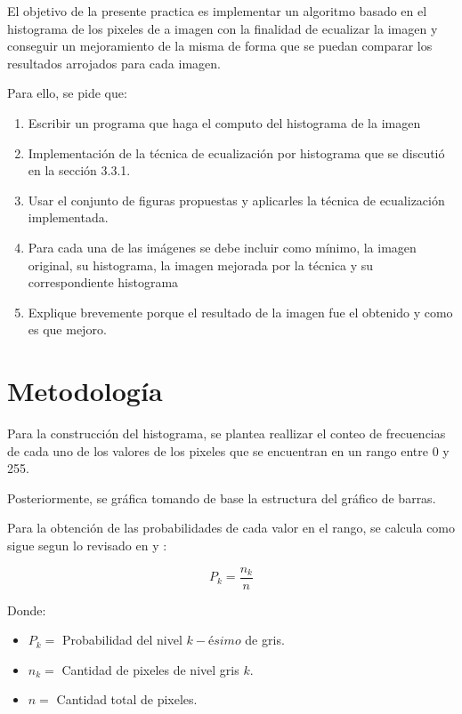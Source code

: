 \documentclass[11pt, letterpaper]{article}
\begin{document}
El objetivo de la presente practica es implementar un algoritmo basado en el histograma de los pixeles de a imagen con la finalidad de ecualizar la imagen y conseguir un mejoramiento de la misma de forma que se puedan comparar los resultados arrojados para cada imagen.

Para ello, se pide que:

\begin{enumerate}
	\item Escribir un programa que haga el computo del histograma de la imagen
	\item Implementación de la técnica de ecualización por histograma que se discutió en la sección 3.3.1.
	\item  Usar el conjunto de figuras propuestas y aplicarles la técnica de ecualización implementada.
	
	\item  Para cada una de las imágenes se debe incluir como mínimo, la imagen original, su histograma, la imagen mejorada por la técnica y su correspondiente histograma
	
	\item  Explique brevemente porque el resultado de la imagen fue el obtenido y como es que mejoro.
	
\end{enumerate}
	
	\newpage
	
	\section{Metodología}
	
	Para la construcción del histograma, se plantea reallizar el conteo de frecuencias de cada uno de los valores de los pixeles que se encuentran en un rango entre 0 y 255.
	
	Posteriormente, se gráfica tomando de base la estructura del gráfico de barras.
	
	Para la obtención de las probabilidades de cada valor en el rango, se calcula como sigue segun lo revisado en \cite{depaoli2012} y \cite{gonzalez2018digital}:
	
	$$P_k = \frac{ n_k}{n} $$
	
	Donde:

	\begin{itemize}
		\item $P_k = $ Probabilidad del nivel $k-ésimo$ de gris.
		\item $n_k = $ Cantidad de pixeles de nivel gris $k$.
		\item $n = $ Cantidad total de pixeles.
	\end{itemize}
	
\end{document}
